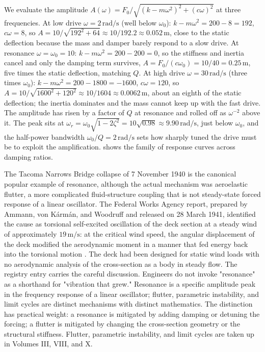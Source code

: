We evaluate the amplitude $A(\omega) = F_{0}/\sqrt{(k - m\omega^{2})^{2}
+ (c\omega)^{2}}$ at three frequencies. At low drive
$\omega = 2\,\si{\radian\per\second}$ (well below $\omega_{0}$):
$k - m\omega^{2} = 200 - 8 = 192$, $c\omega = 8$, so $A = 10/
\sqrt{192^{2} + 64} \approx 10/192.2 \approx 0.052\,\si{\meter}$,
close to the static deflection because the mass and damper barely
respond to a slow drive. At resonance $\omega = \omega_{0} = 10$:
$k - m\omega^{2} = 200 - 200 = 0$, so the stiffness and inertia
cancel and only the damping term survives, $A = F_{0}/(c\omega_{0}) =
10/40 = 0.25\,\si{\meter}$, five times the static deflection, matching
$Q$. At high drive $\omega = 30\,\si{\radian\per\second}$ (three
times $\omega_{0}$): $k - m\omega^{2} = 200 - 1800 = -1600$,
$c\omega = 120$, so $A = 10/\sqrt{1600^{2} + 120^{2}} \approx
10/1604 \approx 0.0062\,\si{\meter}$, about an eighth of the static
deflection; the inertia dominates and the mass cannot keep up with
the fast drive. The amplitude has risen by a factor of $Q$ at
resonance and rolled off as $\omega^{-2}$ above it. The peak sits at
$\omega_{r} = \omega_{0}\sqrt{1 - 2\zeta^{2}} = 10\sqrt{0.98} \approx
9.90\,\si{\radian\per\second}$, just below $\omega_{0}$, and the
half-power bandwidth $\omega_{0}/Q = 2\,\si{\radian\per\second}$ sets
how sharply tuned the drive must be to exploit the amplification.
 shows the family of response curves
across damping ratios.

The Tacoma Narrows Bridge collapse of 7 November 1940 is the
canonical popular example of resonance, although the actual
mechanism was aeroelastic flutter, a more complicated
fluid-structure coupling that is not steady-state forced response
of a linear oscillator. The Federal Works Agency report, prepared
by Ammann, von K\'arm\'an, and Woodruff and released on 28 March
1941, identified the cause as torsional self-excited oscillation
of the deck section at a steady wind of approximately
$19\,\si{\meter\per\second}$: at the critical wind speed, the
angular displacement of the deck modified the aerodynamic moment in
a manner that fed energy back into the torsional motion
\cite{acc:tacoma-narrows-1941}. The deck had been designed for
static wind loads with no aerodynamic analysis of the cross-section
as a body in steady flow. The registry entry
 carries
the careful discussion. Engineers do not invoke "resonance" as a
shorthand for "vibration that grew." Resonance is a specific
amplitude peak in the frequency response of a linear oscillator;
flutter, parametric instability, and limit cycles are distinct
mechanisms with distinct mathematics. The distinction has practical
weight: a resonance is mitigated by adding damping or detuning the
forcing; a flutter is mitigated by changing the cross-section
geometry or the structural stiffness. Flutter, parametric
instability, and limit cycles are taken up in Volumes III, VIII,
and X.


